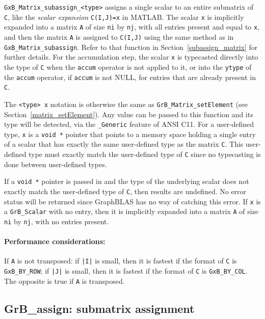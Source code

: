 \documentclass[12pt]{article}
\begin{document}
{\verb'GxB_Matrix_subassign_<type>' assigns a single scalar to an entire
submatrix of \verb'C', like the {\em scalar expansion} \verb'C(I,J)=x' in
MATLAB.  The scalar \verb'x' is implicitly expanded into a matrix \verb'A' of
size \verb'ni' by \verb'nj', with all entries present and equal to \verb'x',
and then the matrix \verb'A' is assigned to
\verb'C(I,J)' using the same method as in \verb'GxB_Matrix_subassign'.  Refer
to that function in Section~\ref{subassign_matrix} for further details.
For the accumulation step, the scalar \verb'x' is typecasted directly into the
type of \verb'C' when the \verb'accum' operator is not applied to it, or into
the \verb'ytype' of the \verb'accum' operator, if \verb'accum' is not NULL, for
entries that are already present in \verb'C'.

The \verb'<type> x' notation is otherwise the same as
\verb'GrB_Matrix_setElement' (see Section~\ref{matrix_setElement}).  Any value
can be passed to this function and its type will be detected, via the
\verb'_Generic' feature of ANSI C11.  For a user-defined type, \verb'x' is a
\verb'void *' pointer that points to a memory space holding a single entry of a
scalar that has exactly the same user-defined type as the matrix \verb'C'.
This user-defined type must exactly match the user-defined type of \verb'C'
since no typecasting is done between user-defined types.

If a \verb'void *' pointer is passed in and the type of the underlying scalar
does not exactly match the user-defined type of \verb'C', then results are
undefined.  No error status will be returned since GraphBLAS has no way of
catching this error.
If \verb'x' is a \verb'GrB_Scalar' with no entry, then it is implicitly
expanded into a matrix \verb'A' of size \verb'ni' by \verb'nj', with no entries
present.

\paragraph{\bf Performance considerations:} %
If \verb'A' is not transposed: if \verb'|I|' is small, then it is fastest if
the format of \verb'C' is \verb'GxB_BY_ROW'; if \verb'|J|' is small, then it is
fastest if the format of \verb'C' is \verb'GxB_BY_COL'.  The opposite is true
if \verb'A' is transposed.

\newpage
\subsection{{\sf GrB\_assign:} submatrix assignment} %
\label{assign}

}
\end{document}
